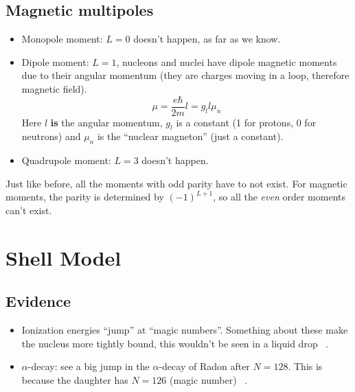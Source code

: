 \documentclass[letter]{article}
\begin{document}
\subsection{Magnetic multipoles}

\begin{itemize}
\item Monopole moment: $L=0$ doesn't happen, as far as we know.
\item Dipole moment: $L=1$, nucleons and nuclei have dipole magnetic
  moments due to their angular momentum (they are charges moving in a
  loop, therefore magnetic field). 
  \begin{equation*}
    \mu = \frac{e\hbar}{2m}l=g_ll\mu_n
  \end{equation*}
Here $l$ \textbf{is} the angular momentum, $g_l$ is a constant (1 for
protons, 0 for neutrons) and $\mu_n$ is the ``nuclear magneton'' (just
a constant).
\item Quadrupole moment: $L=3$ doesn't happen.
\end{itemize}

Just like before, all the moments with odd parity have to not
exist. For magnetic moments, the parity is determined by $(-1)^{L+1}$,
so all the \textit{even} order moments can't exist.

\section{Shell Model}

\subsection{Evidence}
\begin{itemize}
\item Ionization energies ``jump'' at ``magic numbers''. Something about these make the nucleus more tightly
  bound, this wouldn't be seen in a liquid
  drop ~\cite[Lec. 12]{lecture}.
\item $\alpha$-decay: see a big jump in the $\alpha$-decay of Radon
  after $N=128$. This is because the daughter has $N=126$ (magic
  number) ~\cite[Lec. 12]{lecture}.
\end{itemize}
\end{document}
